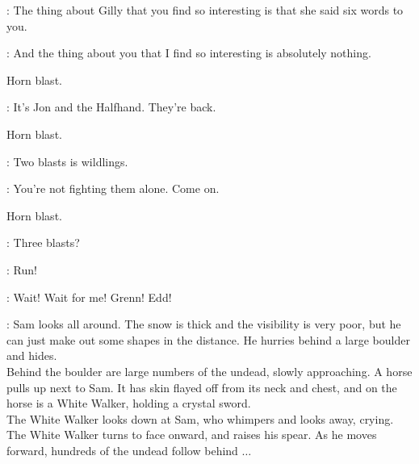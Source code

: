 \EDD: The thing about Gilly that you find so interesting is that she said six words to you. 

\SAM:  And the thing about you that I find so interesting is absolutely nothing. 

\sfx Horn blast.

\SAM: It's Jon and the Halfhand. They're back.

\sfx Horn blast.

\GRENN:  Two blasts is wildlings. 

\EDD: You're not fighting them alone. Come on. 

\sfx Horn blast.


\GRENN: Three blasts? 

\EDD:  Run! 


\SAM:  Wait! Wait for me!  Grenn! Edd! 


\n: Sam looks all around. The snow is thick and the visibility is very poor, but he can just make out some shapes in the distance. He hurries behind a large boulder and hides.\\
Behind the boulder are large numbers of the undead, slowly approaching. A horse pulls up next to Sam. It has skin flayed off from its neck and chest, and on the horse is a White Walker, holding a crystal sword.\\
The White Walker looks down at Sam, who whimpers and looks away, crying. The White Walker turns to face onward, and raises his spear. As he moves forward, hundreds of the undead follow behind $\ldots$


